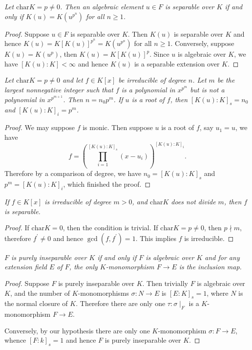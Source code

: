 \begin{problem}\em
Let $\mathrm{char}K=p\neq 0$. Then an algebraic element $u\in F$ is separable over $K$ if and only if $K(u)=K(u^{p^n})$ for all $n\geq 1$.
\end{problem}
\begin{proof}
Suppose $u\in F$ is separable over $K$. Then $K(u)$ is separable over $K$ and hence $K(u)=K[K(u)]^{p^n}=K(u^{p^n})$ for all $n\ge 1$. Conversely, suppose $K(u)=K(u^p)$, then $K(u)=K[K(u)]^p$. Since $u$ is algebraic over $K$, we have $[K(u):K]<\infty$ and hence $K(u)$ is a separable extension over $K$.
\end{proof}
\begin{problem}\em
Let $\mathrm{char}K=p\neq 0$ and let $f\in K[x]$ be irreducible of degree $n$.
Let $m$ be the largest nonnegative integer such that $f$ is a polynomial in $x^{p^m}$ but is not a polynomial in $x^{p^{m+1}}$. Then $n=n_0 p^m$. If $u$ is a root of $f$, then $[K(u):K]_s=n_0$ and $[K(u):K]_i=p^m$.
\end{problem}
\begin{proof}
We may suppose $f$ is monic. Then suppose $u$ is a root of $f$, say $u_1=u$, we have 
$$
f=\left( \prod_{i=1}^{\left[ K\left( u \right) :K \right] _s}{\left( x-u_i \right)} \right) ^{\left[ K\left( u \right) :K \right] _i}.
$$
Therefore by a comparison of degree, we have $n_0=[K(u):K]_s$ and $p^m=[K(u):K]_i$, which finished the proof.
\end{proof}
\begin{problem}\em
If $f\in K[x]$ is irreducible of degree $m>0$, and $\mathrm{char}K$ does not divide $m$, then $f$ is separable.
\end{problem}
\begin{proof}
If $\mathrm{char}K=0$, then the condition is trivial. If $\mathrm{char}K=p\ne 0$, then $p\nmid m$, therefore $f^\prime\ne 0$ and hence $\gcd(f,f^\prime)=1$. This implies $f$ is irreducible.
\end{proof}
\begin{problem}\em
$F$ is purely inseparable over $K$ if and only if $F$ is algebraic over $K$ and for any extension field $E$ of $F$, the only $K$-monomorphism $F\to E$ is the inclusion map.
\end{problem}
\begin{proof}
Suppose $F$ is purely inseparable over $K$. Then trivially $F$ is algebraic over $K$, and the number of $K$-monomorphisms $\sigma:N\to E$ is $[E:K]_s=1$, where $N$ is the normal closure of $K$. Therefore there are only one $\tau:\sigma\mid_F$ is a $K$-monomorphism $F\to E$.\par
Conversely, by our hypothesis there are only one $K$-monomorphism $\sigma:F\to E$, whence $[F:k]_s=1$ and hence $F$ is purely inseparable over $K$.
\end{proof}
